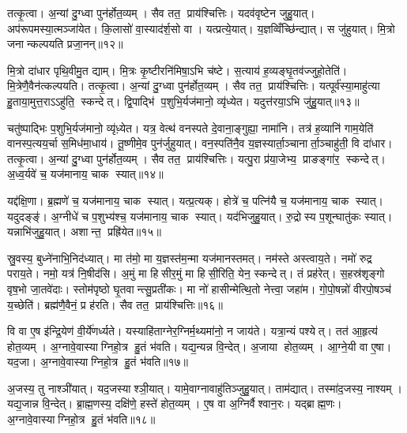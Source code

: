 तत्कृ॒त्वा। अ॒न्यां दु॒ग्ध्वा पुन॑र्\mbox{}होत॒व्यम्। सैव तत॒ प्राय॑श्चित्तिः। यदव॑वृष्टेन जुहु॒यात्। अप॑रूपमस्या॒त्मञ्जा॑येत। कि॒लासो॑ वा॒स्याद॑र्\mbox{}श॒सो वा। यत्प्रत्ये॒यात्। य॒ज्ञव्विँच्छि॑न्द्यात्। स जु॑हुयात्। मि॒त्रो जनान्कल्पयति प्रजा॒नन्॥१२॥

मि॒त्रो दा॑धार पृथि॒वीमु॒त द्याम्। मि॒त्रः कृ॒ष्टीरनि॑मिषा॒ऽभि च॑ष्टे। स॒त्याय॑ ह॒व्यङ्घृ॒तव॑ज्जुहो॒तेति॑। मि॒त्रेणै॒वैन॑त्कल्पयति। तत्कृ॒त्वा। अ॒न्यां दु॒ग्ध्वा पुन॑र्\mbox{}होत॒व्यम्। सैव तत॒ प्राय॑श्चित्तिः। यत्पूर्व॑स्या॒माहु॑त्या हु॒ताया॒मुत्त॒राऽऽहु॑ति॒ स्कन्देत्। द्वि॒पाद्भि॑ प॒शुभि॒र्यज॑मानो॒ व्यृ॑ध्येत। यदुत्त॑रया॒ऽभि जु॑हु॒यात्॥१३॥

चतु॑ष्पाद्भिः प॒शुभि॒र्यज॑मानो॒ व्यृ॑ध़्येत। यत्र॒ वेत्थ॑ वनस्पते दे॒वाना॒ङ्गुह्या॒ नामा॑नि। तत्र॑ ह॒व्यानि॑ गाम॒येति॑ वानस्प॒त्यय॒र्चा स॒मिध॑मा॒धाय॑। तू॒ष्णीमे॒व पुन॑र्जुहुयात्। वन॒स्पति॑नै॒व य॒ज्ञस्यार्ता॒ञ्चानार्ता॒ञ्चाहु॑ती॒ वि दा॑धार। तत्कृ॒त्वा। अ॒न्यां दु॒ग्ध्वा पुन॑र्\mbox{}होत॒व्यम्। सैव तत॒ प्राय॑श्चित्तिः। यत्पु॒रा प्र॑या॒जेभ्य॒ प्राङङ्गा॑र॒ स्कन्देत्। अ॒ध्व॒र्यवे॑ च॒ यज॑मानाय॒ चाक स्यात्॥१४॥

यद्द॑क्षि॒णा। ब्र॒ह्मणे॑ च॒ यज॑मानाय॒ चाक स्यात्। यत्प्र॒त्यक्। होत्रे॑ च॒ पत्नि॑यै च॒ यज॑मानाय॒ चाक स्यात्। यदुदङ्ङ्॑। अ॒ग्नीधे॑ च प॒शुभ्य॑श्च॒ यज॑मानाय॒ चाक स्यात्। यद॑भिजुहु॒यात्। रु॒द्रोस्य प॒शून्घातु॑कः स्यात्। यन्नाभि॑जुहु॒यात्। अशान्त॒ प्रह्रि॑येत॥१५॥

स्रु॒वस्य॒ बुध्ने॑नाभि॒निद॑ध्यात्। मा त॑मो॒ मा य॒ज्ञस्त॑म॒न्मा यज॑मानस्तमत्। नम॑स्ते अस्त्वाय॒ते। नमो॑ रुद्र पराय॒ते। नमो॒ यत्र॑ नि॒षीद॑सि। अ॒मुं मा हिसीर॒मुं मा हिसी॒रिति॒ येन॒ स्कन्देत्। तं प्रह॑रेत्। स॒हस्र॑शृङ्गो वृष॒भो जा॒तवे॑दाः। स्तोम॑पृष्ठो घृ॒तवान्त्सु॒प्रती॑कः। मा नो॑ हासीन्मेत्थि॒तो नेत्त्वा॒ जहा॑म। गो॒पो॒षन्नो॑ वीरपो॒षञ्च॑ य॒च्छेति॑। ब्रह्म॑णै॒वैनं॒ प्र ह॑रति। सैव तत॒ प्राय॑श्चित्तिः॥१६॥

वि वा ए॒ष इ॑न्द्रि॒येण॑ वी॒र्ये॑णर्ध्यते। यस्याहि॑ताग्नेर॒ग्निर्म॒थ्यमा॑नो॒ न जाय॑ते। यत्रा॒न्यं पश्येत्। तत॑ आ॒हृत्य॑ होत॒व्यम्। अ॒ग्नावे॒वास्याग्निहो॒त्र हु॒तं भ॑वति। यद्य॒न्यन्न वि॒न्देत्। अ॒जाया होत॒व्यम्। आ॒ग्ने॒यी वा ए॒षा। यद॒जा। अ॒ग्नावे॒वास्याग्निहो॒त्र हु॒तं भ॑वति॥१७॥

अ॒जस्य॒ तु नाश्ञी॑यात्। यद॒जस्याश्ञी॒यात्। यामे॒वाग्नावाहु॑तिञ्जुहु॒यात्। ताम॑द्यात्। तस्मा॑द॒जस्य॒ नाश्यम्। यद्य॒जान्न वि॒न्देत्। ब्रा॒ह्म॒णस्य॒ दक्षि॑णे॒ हस्ते॑ होत॒व्यम्। ए॒ष वा अ॒ग्निर्वैश्वान॒रः। यद्ब्राह्म॒णः। अ॒ग्नावे॒वास्याग्निहो॒त्र हु॒तं भ॑वति॥१८॥

